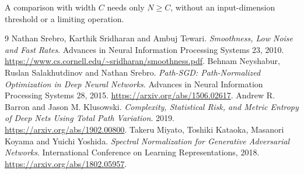 \documentclass[11pt]{article}
\theoremstyle{definition}\newtheorem{definition}[theorem]{Definition}
\theoremstyle{remark}\newtheorem{remark}[theorem]{Remark}
\begin{document}
A comparison with width $C$ needs only $N\ge C$, without an input-dimension threshold or a limiting operation.









\begin{thebibliography}{9}
 Nathan Srebro, Karthik Sridharan and Ambuj Tewari. \emph{Smoothness, Low Noise and Fast Rates}. Advances in Neural Information Processing Systems 23, 2010. \url{https://www.cs.cornell.edu/~sridharan/smoothness.pdf}.
 Behnam Neyshabur, Ruslan Salakhutdinov and Nathan Srebro. \emph{Path-SGD: Path-Normalized Optimization in Deep Neural Networks}. Advances in Neural Information Processing Systems 28, 2015. \url{https://arxiv.org/abs/1506.02617}.
 Andrew R. Barron and Jason M. Klusowski. \emph{Complexity, Statistical Risk, and Metric Entropy of Deep Nets Using Total Path Variation}. 2019. \url{https://arxiv.org/abs/1902.00800}.
 Takeru Miyato, Toshiki Kataoka, Masanori Koyama and Yuichi Yoshida. \emph{Spectral Normalization for Generative Adversarial Networks}. International Conference on Learning Representations, 2018. \url{https://arxiv.org/abs/1802.05957}.
\end{thebibliography}
\end{document}
